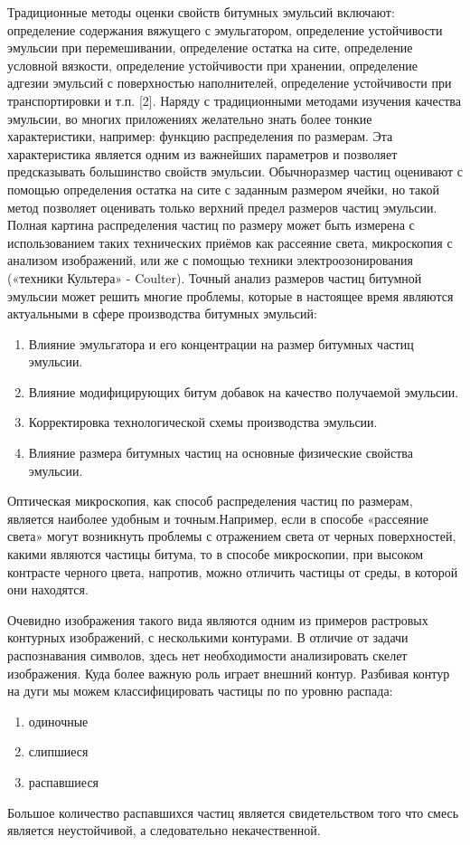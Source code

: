 Традиционные методы оценки свойств битумных эмульсий включают: определение содержания вяжущего с эмульгатором, определение устойчивости эмульсии при перемешивании, определение остатка на сите, определение условной вязкости, определение устойчивости при хранении, определение адгезии эмульсий с поверхностью наполнителей, определение устойчивости при транспортировки и т.п. [2].  Наряду с традиционными методами изучения  качества эмульсии, во многих приложениях желательно знать более тонкие характеристики, например: функцию распределения по размерам. Эта характеристика является одним из важнейших параметров и позволяет предсказывать большинство свойств эмульсии. Обычноразмер частиц оценивают с помощью определения остатка на сите с заданным размером ячейки, но такой метод позволяет оценивать только верхний предел размеров частиц эмульсии. Полная картина распределения частиц по размеру может быть измерена с использованием таких технических приёмов как рассеяние света, микроскопия с анализом изображений, или же с помощью техники электроозонирования («техники Культера» - Coulter). Точный анализ размеров частиц битумной эмульсии может решить многие проблемы, которые в настоящее время являются актуальными в сфере производства битумных эмульсий:
\begin{enumerate}
\item Влияние эмульгатора и его концентрации на размер битумных частиц эмульсии.
\item Влияние модифицирующих битум добавок на качество получаемой эмульсии.
\item Корректировка технологической схемы производства эмульсии.
\item Влияние размера битумных частиц на основные физические свойства эмульсии.
\end{enumerate}

Оптическая микроскопия, как способ распределения частиц по размерам, является наиболее удобным и точным.Например, если в способе «рассеяние света» могут возникнуть проблемы с отражением света от черных поверхностей, какими являются частицы битума, то в способе микроскопии, при высоком контрасте черного цвета, напротив, можно отличить частицы от среды, в которой они находятся.

Очевидно изображения такого вида являются одним из примеров растровых контурных изображений, с несколькими контурами. В отличие от задачи распознавания символов, здесь нет необходимости анализировать скелет изображения. Куда более важную роль играет внешний контур. Разбивая контур на дуги мы можем классифицировать частицы по по уровню распада:
\begin{enumerate}
\item одиночные
\item слипшиеся
\item распавшиеся
\end{enumerate}
Большое количество распавшихся частиц является свидетельством того что смесь является неустойчивой, а следовательно некачественной.

